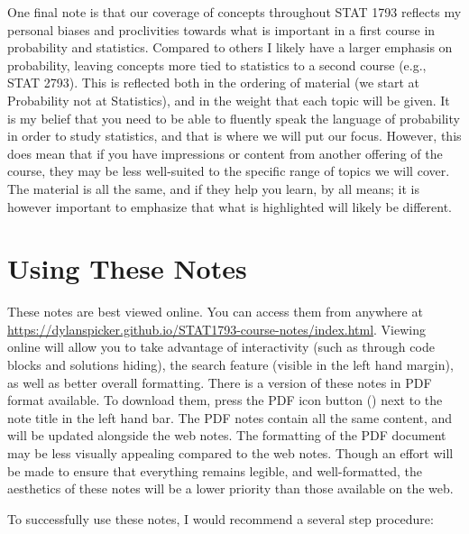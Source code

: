 \documentclass[
  letterpaper,
  DIV=11,
  numbers=noendperiod]{scrreprt}
\theoremstyle{definition}
\theoremstyle{definition}
\theoremstyle{definition}
\theoremstyle{remark}
\begin{document}
One final note is that our coverage of concepts throughout STAT 1793
reflects my personal biases and proclivities towards what is important
in a first course in probability and statistics. Compared to others I
likely have a larger emphasis on probability, leaving concepts more tied
to statistics to a second course (e.g., STAT 2793). This is reflected
both in the ordering of material (we start at Probability not at
Statistics), and in the weight that each topic will be given. It is my
belief that you need to be able to fluently speak the language of
probability in order to study statistics, and that is where we will put
our focus. However, this does mean that if you have impressions or
content from another offering of the course, they may be less
well-suited to the specific range of topics we will cover. The material
is all the same, and if they help you learn, by all means; it is however
important to emphasize that what is highlighted will likely be
different.

\section*{Using These Notes}\label{using-these-notes}


These notes are best viewed online. You can access them from anywhere at
\url{https://dylanspicker.github.io/STAT1793-course-notes/index.html}.
Viewing online will allow you to take advantage of interactivity (such
as through code blocks and solutions hiding), the search feature
(visible in the left hand margin), as well as better overall formatting.
There is a version of these notes in PDF format available. To download
them, press the PDF icon button () next to the note title in the left
hand bar. The PDF notes contain all the same content, and will be
updated alongside the web notes. The formatting of the PDF document may
be less visually appealing compared to the web notes. Though an effort
will be made to ensure that everything remains legible, and
well-formatted, the aesthetics of these notes will be a lower priority
than those available on the web.

To successfully use these notes, I would recommend a several step
procedure:
\end{document}

